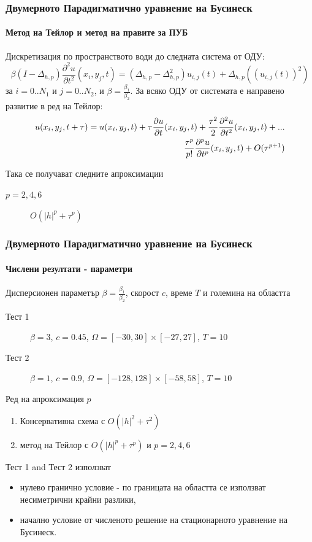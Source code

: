 \documentclass{beamer}
\begin{document}
\begin{frame}
\frametitle{Двумерното Парадигматично уравнение на Бусинеск}
\framesubtitle{Метод на Тейлор и метод на правите за ПУБ}

Дискретизация по пространството води до следната система от ОДУ:
\begin{equation}\label{DiscreteEq}
\beta (I-\Delta_{h,p}) \frac{\partial^2 u}{\partial t^2}(x_i, y_j, t)=
 (\Delta_{h,p} - \Delta_{h,p}^2) u_{i, j}(t) + \Delta_{h,p} ( ( u_{i, j}(t) )^2 )
\end{equation}
за $i = 0..N_1$ и $j=0..N_2$, и $\beta = \frac{\beta_1}{\beta_2}$. За всяко ОДУ от системата е направено развитие в ред на Тейлор:
\begin{align} \label{TSe}
\small
u(x_i, y_j, {\small t+\tau}%
) = u(x_i, y_j, t) + \tau \frac{ \partial u }{ \partial t }(x_i, y_j, t)  +  \frac{\tau^2}{2} \frac{ \partial^2 u }{ \partial t^2 }(x_i, y_j, t)  + ... 
\nonumber
\\
\frac{ \tau^p }{ p! } \frac{ \partial^p u }{ \partial t^p }(x_i, y_j, t) + O(\tau^{p+1})
\end{align}

Така се получават следните апроксимации
\begin{description}
 \item[$p=2,4,6$] $O(|h|^p + \tau^p)$
\end{description}

\end{frame}



\begin{frame}
\frametitle{Двумерното Парадигматично уравнение на Бусинеск}
\framesubtitle{Числени резултати - параметри}

Дисперсионен параметър $\beta= \frac{\beta_1}{\beta_2}$, скорост $c$, време $T$ и големина на областта
\begin{description}
 \item[Тест 1] $\beta = 3$, $c = 0.45$, $\Omega = [-30, 30] \times [-27, 27]$, $T = 10$
 \item[Тест 2] $\beta = 1$, $c = 0.9$, $\Omega = [-128, 128] \times [-58, 58]$, $T = 10$
\end{description}

Ред на апроксимация $p$
\begin{enumerate}
  \item Консервативна схема с $O(|h|^2 + \tau^2)$
  \item метод на Тейлор с $O(|h|^p + \tau^p)$ и $p = 2, 4, 6$
\end{enumerate}

Тест 1 and Тест 2 използват 
\begin{itemize} 
\item нулево гранично условие - по границата на областта се използват несиметрични крайни разлики,
\item начално условие от численото решение на стационарното уравнение на Бусинеск.
\end{itemize}
\end{frame}
\end{document}
